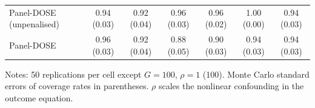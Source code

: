 \documentclass[pdflatex,sn-basic]{sn-jnl}%
\theoremstyle{thmstyleone}
\theoremstyle{thmstyletwo}
\renewenvironment{table}[1][]{\begin{tableorg}[#1]\centering\tablebodyfont}{\end{tableorg}}
\begin{document}
\begin{appendices}
\begin{table}[!ht]
{\begin{threeparttable}
\begin{tabular}{lcccccc}
\quad Panel-DOSE (unpenalised) & 0.94 (0.03) & 0.92 (0.04) & 0.96 (0.03) & 0.96 (0.02) & 1.00 (0.00) & 0.94 (0.03)\\
\quad Panel-DOSE & 0.96 (0.03) & 0.92 (0.04) & 0.88 (0.05) & 0.90 (0.03) & 0.94 (0.03) & 0.94 (0.03)\\
\bottomrule
\end{tabular}
\begin{tablenotes}\scriptsize
\item Notes: 50 replications per cell except $G=100$, $\rho=1$ (100). Monte Carlo standard errors of coverage rates in parentheses. $\rho$ scales the nonlinear confounding in the outcome equation.
\end{tablenotes}
\end{threeparttable}}
\end{table}


\end{appendices}
\end{document}
